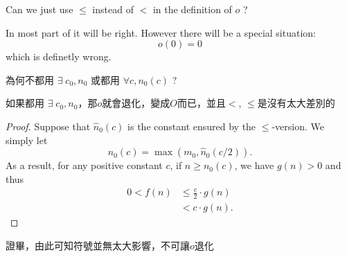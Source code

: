 \begin{exercise}
    Can we just use $\leq$ instead of $<$ in the definition of $o$ ? 
\end{exercise}
\begin{answer}
    In most part of it will be right. However there will be a special situation:
    \[
        o(0) = 0
    \]
    which is definetly wrong.
\end{answer}

\begin{exercise}
    為何不都用 $\exists \; c_0, n_0$ 或都用 $\forall c, n_0(c)$ ?
\end{exercise}
\begin{answer}
    如果都用 $\exists \; c_0, n_0$，那$o$就會退化，變成$O$而已，並且$<$, $\leq$是沒有太大差別的
    \vspace{1em}
    \begin{proof}
        Suppose that $\hat{n}_0(c)$ is the constant ensured by the $\leq$-version. 
        We simply let $$n_0(c) = \max(m_0,\hat{n}_0(c/2)).$$ 
        As a result, for any positive constant $c$, if $n \geq n_0(c)$, we have $g(n) > 0$ and thus
        \begin{align*}
            0 < f(n) &\leq \frac{c}{2} \cdot g(n) \\
                    &< c \cdot g(n).
        \end{align*}
    \end{proof}
證畢，由此可知符號並無太大影響，不可讓$o$退化
\end{answer}

\newpage